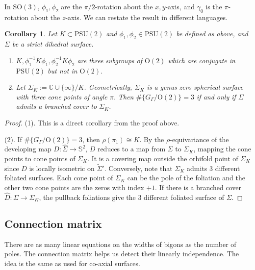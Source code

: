 \documentclass[pdflatex,sn-mathphys]{sn-jnl}%
\numberwithin{equation}{section}
\theoremstyle{thmstyleone}%
\newtheorem{corollary}[theorem]{Corollary}
\newcommand{\CC}{\mathbb{C}}
\newcommand{\STwo}{\mathbb{S}^2}
\newcommand{\SOthr}{\mathrm{SO}(3)}
\newcommand{\PSUtwo}{\mathrm{PSU}(2)}
\newcommand{\Otwo}{\mathrm{O}(2)}
\newcommand{\qdf}{quadratic differential}
\begin{document}
In $\SOthr$, $\phi_1, \phi_2$ are the $\pi/2$-rotation about the $x,y$-axis, and $\gamma_0$ is the $\pi$-rotation about the $z$-axis. We can restate the result in different languages. %
\begin{corollary}\label{cor:special_D} Let $K\subset\PSUtwo$ and $\phi_1, \phi_2 \in \PSUtwo$ be defined as above, and $\Sigma$ be a strict dihedral surface.
\begin{enumerate}
    \item  $K, \phi_1^{-1} K \phi_1, \phi_2^{-1} K \phi_2$ are three subgroups of $\Otwo$ which are conjugate in $\PSUtwo$ but not in $\Otwo$.
    \item Let $\Sigma_K := \CC\cup\{\infty\}/ K$. Geometrically, $\Sigma_K$ is a genus zero spherical surface with three cone points of angle $\pi$. Then $\#\{ G_\Gamma/\Otwo \}=3$ if and only if $\Sigma$ admits a branched cover to $\Sigma_K$. 
\end{enumerate}
\end{corollary}
\begin{proof}
    (1). This is a direct corollary from the proof above.

    (2). If $\#\{ G_\Gamma/\Otwo \}=3$, then $\rho(\pi_1)\cong K$. %
    By the $\rho$-equivariance of the developing map $D:\hat{\Sigma}\to\STwo$, $D$ reduces to a map from $\Sigma$ to $\Sigma_K$, mapping the cone points to cone points of $\Sigma_K$. It is a covering map outside the orbifold point of $\Sigma_K$ since $D$ is locally isometric on $\tilde{\Sigma}'$.
    Conversely, note that $\Sigma_K$ admits 3 different foliated surfaces. Each cone point of $\Sigma_K$ can be the pole of the foliation and the other two cone points are the zeros with index $+1$. If there is a branched cover $\hat{D}:\Sigma\to\Sigma_K$, the pullback foliations give the 3 different foliated surface of $\Sigma$.
\end{proof}



\subsection{Connection matrix}
There are as many linear equations on the widths of bigons as the number of poles. The connection matrix helps us detect their linearly independence. %
The idea is the same as \cite{Li19} used for co-axial surfaces.
\end{document}
